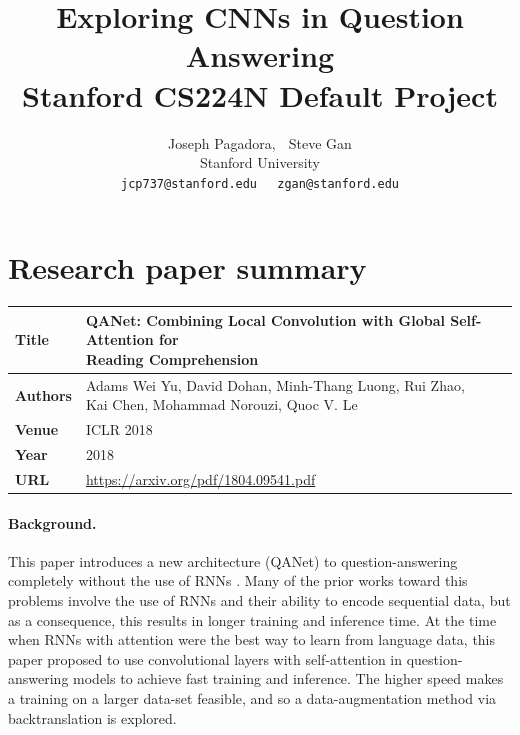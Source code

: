 \documentclass{article}
\title{
  Exploring CNNs in Question Answering \\
  \vspace{1em}
  \small{\normalfont Stanford CS224N Default Project}  %
}
\author{
  Joseph Pagadora, $\;$ Steve Gan \\
  Stanford University \\
  \texttt{jcp737@stanford.edu}$\;\;\;\;$
  \texttt{zgan@stanford.edu} \\
}
\begin{document}
\maketitle


\section{Research paper summary}

\begin{table}[h]
    \centering
    \begin{tabular}{ll}
        \toprule
        \textbf{Title} & \makecell{QANet: Combining Local Convolution with Global Self-Attention for \\ Reading Comprehension} \\
        \midrule
        \textbf{Authors} & \makecell{Adams Wei Yu, David Dohan, Minh-Thang Luong, Rui Zhao, \\ Kai Chen, Mohammad Norouzi, Quoc V. Le} \\
        \textbf{Venue} & ICLR 2018 \\
        \textbf{Year}  & 2018 \\
        \textbf{URL}   & \url{https://arxiv.org/pdf/1804.09541.pdf} \\
        \bottomrule
    \end{tabular}
    \vspace{1em}
\end{table}

\paragraph{Background.}
This paper introduces a new architecture (QANet) to question-answering completely without the use of RNNs \cite{YU}. Many of the prior works toward this problems involve the use of RNNs and their ability to encode sequential data, but as a consequence, this results in longer training and inference time. At the time when RNNs with attention were the best way to learn from language data, this paper proposed to use convolutional layers with self-attention in question-answering models to achieve fast training and inference. The higher speed makes a training on a larger data-set feasible, and so a data-augmentation method via backtranslation is explored.
\end{document}
